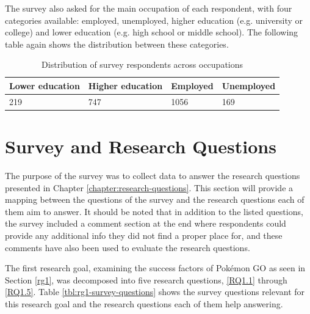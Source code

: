 
The survey also asked for the main occupation of each respondent, with four categories available: employed, unemployed, higher education (e.g. university or college) and lower education (e.g. high school or middle school). The following table again shows the distribution between these categories. 

\begin{table}[h]
	\centering
	\caption{Distribution of survey respondents across occupations}
	\label{tbl:survey-occupation-distribution}
	\begin{tabularx}{\textwidth}{|l|l|X|X|}
		\hline
		\textbf{Lower education} & \textbf{Higher education} & \textbf{Employed} & \textbf{Unemployed}\\
		\hline\hline
		
		219 & 747 & 1056 & 169\\
		\hline
	\end{tabularx}
\end{table}

\section{Survey and Research Questions}

The purpose of the survey was to collect data to answer the research questions presented in Chapter \ref{chapter:research-questions}. This section will provide a mapping between the questions of the survey and the research questions each of them aim to answer. It should be noted that in addition to the listed questions, the survey included a comment section at the end where respondents could provide any additional info they did not find a proper place for, and these comments have also been used to evaluate the research questions.


The first research goal, examining the success factors of Pokémon GO as seen in Section \ref{rg1}, was decomposed into five research questions, \ref{RQ1.1} through \ref{RQ1.5}. Table \ref{tbl:rg1-survey-questions} shows the survey questions relevant for this research goal and the research questions each of them help answering.

